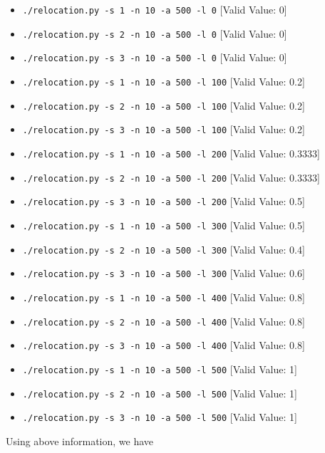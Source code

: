 \documentclass[12pt]{article}
\begin{document}
\begin{enumerate}[1.]
    \begin{itemize}
        \item \texttt{./relocation.py -s 1 -n 10 -a 500 -l 0} [Valid Value: 0]
        \item \texttt{./relocation.py -s 2 -n 10 -a 500 -l 0} [Valid Value: 0]
        \item \texttt{./relocation.py -s 3 -n 10 -a 500 -l 0} [Valid Value: 0]
        \item \texttt{./relocation.py -s 1 -n 10 -a 500 -l 100} [Valid Value: 0.2]
        \item \texttt{./relocation.py -s 2 -n 10 -a 500 -l 100} [Valid Value: 0.2]
        \item \texttt{./relocation.py -s 3 -n 10 -a 500 -l 100} [Valid Value: 0.2]
        \item \texttt{./relocation.py -s 1 -n 10 -a 500 -l 200} [Valid Value: 0.3333]
        \item \texttt{./relocation.py -s 2 -n 10 -a 500 -l 200} [Valid Value: 0.3333]
        \item \texttt{./relocation.py -s 3 -n 10 -a 500 -l 200} [Valid Value: 0.5]
        \item \texttt{./relocation.py -s 1 -n 10 -a 500 -l 300} [Valid Value: 0.5]
        \item \texttt{./relocation.py -s 2 -n 10 -a 500 -l 300} [Valid Value: 0.4]
        \item \texttt{./relocation.py -s 3 -n 10 -a 500 -l 300} [Valid Value: 0.6]
        \item \texttt{./relocation.py -s 1 -n 10 -a 500 -l 400} [Valid Value: 0.8]
        \item \texttt{./relocation.py -s 2 -n 10 -a 500 -l 400} [Valid Value: 0.8]
        \item \texttt{./relocation.py -s 3 -n 10 -a 500 -l 400} [Valid Value: 0.8]
        \item \texttt{./relocation.py -s 1 -n 10 -a 500 -l 500} [Valid Value: 1]
        \item \texttt{./relocation.py -s 2 -n 10 -a 500 -l 500} [Valid Value: 1]
        \item \texttt{./relocation.py -s 3 -n 10 -a 500 -l 500} [Valid Value: 1]
    \end{itemize}

    \bigskip

    Using above information, we have


\end{enumerate}
\end{document}
